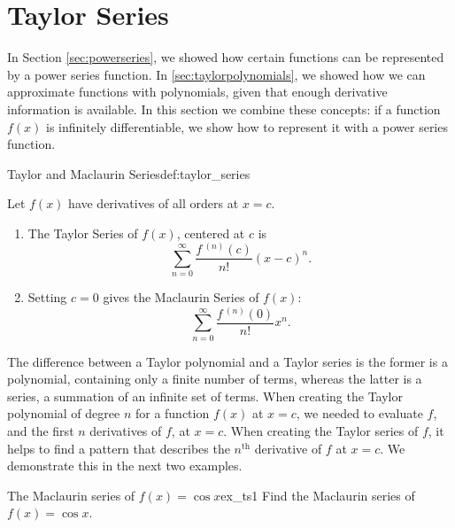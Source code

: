 \section{Taylor Series}\label{sec:taylorseries}


In Section \ref{sec:powerseries}, we showed how certain functions can be represented by a power series function. In \ref{sec:taylorpolynomials}, we showed how we can approximate functions with polynomials, given that enough derivative information is available. In this section we combine these concepts: if a function $f(x)$ is infinitely differentiable, we show how to represent it with a power series function.



\begin{definition}{Taylor and Maclaurin Series}{def:taylor_series}
{Let $f(x)$ have derivatives of all orders at $x=c$.
\begin{enumerate}
	\item The {Taylor Series of $f(x)$, centered at $c$} is
	$$\sum_{n=0}^\infty \frac{f\,^{(n)}(c)}{n!}(x-c)^n.$$
	\item	Setting $c=0$ gives the {Maclaurin Series of $f(x)$}:
	$$\sum_{n=0}^\infty \frac{f\,^{(n)}(0)}{n!}x^n.$$
\end{enumerate}
}
\end{definition}





The difference between a Taylor polynomial and a Taylor series is the former is a polynomial, containing only a finite number of terms, whereas the latter is a series, a summation of an infinite set of terms. When creating the Taylor polynomial of degree $n$ for a function $f(x)$ at $x=c$, we needed to evaluate $f$, and the first $n$ derivatives of $f$, at $x=c$. When creating the Taylor series of $f$, it helps to find a pattern that describes the $n^\text{th}$ derivative of $f$ at $x=c$. We demonstrate this in the next two examples.\\

\begin{example}{The Maclaurin series of $f(x) = \cos x$}{ex_ts1}
{Find the Maclaurin series of $f(x)=\cos x$.}
\end{example}



